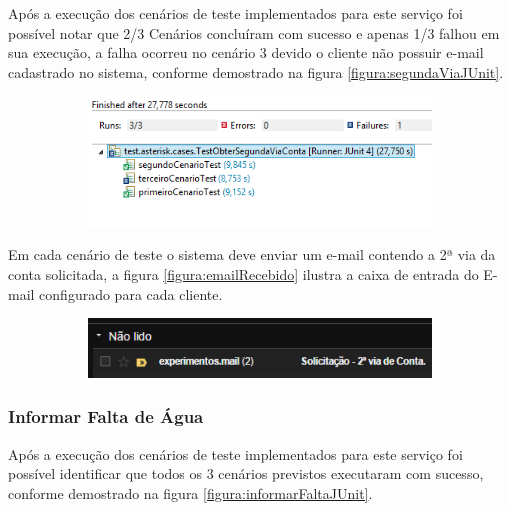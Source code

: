  Após a execução dos cenários de teste implementados para este serviço foi possível notar que 2/3 Cenários concluíram com sucesso e apenas 1/3 falhou em sua execução, a falha ocorreu no cenário 3 devido o cliente não possuir e-mail cadastrado no sistema, conforme demostrado na figura \ref{figura:segundaViaJUnit}.	
 \begin{figure}[H]
 	\centering
		\caption{Obter 2ª Via de Conta - Detalhes execução dos testes}
		\label{figura:segundaViaJUnit}
 	\begin{subfigure}[H]{\textwidth}
 		\centering
 		\includegraphics{figuras/cenarios/segunda_via/junit_result.PNG}
 	\end{subfigure}
 \end{figure}	
	

Em cada cenário de teste o sistema deve enviar um e-mail contendo a 2ª via da conta solicitada, a figura \ref{figura:emailRecebido} ilustra a caixa de entrada do E-mail configurado para cada cliente.
\begin{figure}[H]
	\centering
	\caption{Obter 2ª Via de Conta - E-mail recebido pelo cliente}
	\label{figura:emailRecebido}
	\begin{subfigure}[H]{\textwidth}
		\centering
		\includegraphics{figuras/cenarios/segunda_via/envio_email.PNG}
	\end{subfigure}
\end{figure}

	
\subsubsection{Informar Falta de Água}

 Após a execução dos cenários de teste implementados para este serviço foi possível identificar que todos os 3 cenários previstos executaram com sucesso, conforme demostrado na figura \ref{figura:informarFaltaJUnit}.	

